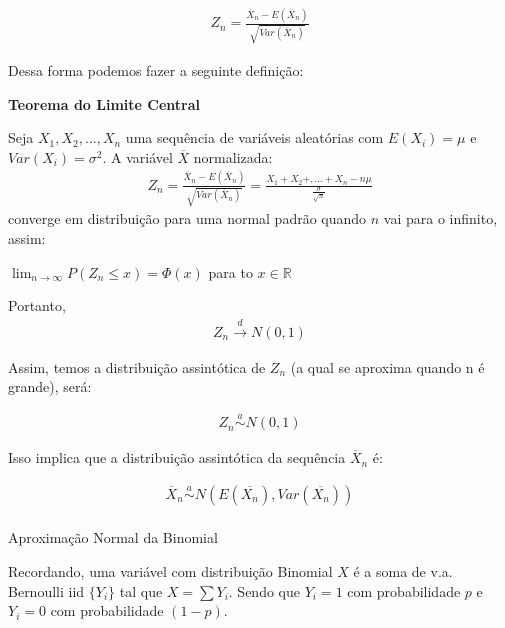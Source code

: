 \documentclass[
  letterpaper,
  DIV=11,
  numbers=noendperiod]{scrartcl}
\makeatletter
\let\oldparagraph\paragraph
\renewcommand{\paragraph}{
    \@ifstar
      \xxxParagraphStar
      \xxxParagraphNoStar
  }
\newcommand{\xxxParagraphStar}[1]{\oldparagraph*{#1}\mbox{}}
\newcommand{\xxxParagraphNoStar}[1]{\oldparagraph{#1}\mbox{}}
\makeatother
\begin{document}
\hfill\break

\[\begin{array}{ccc}
Z_n=\frac{\overline{X}_n- E(\overline{X}_n)}{\sqrt{Var(\overline{X}_n)}} 
\end{array}\]

Dessa forma podemos fazer a seguinte definição:

\begin{definicao}

\textbf{Teorema do Limite Central}

Seja \(X_1, X_2,...,X_n\) uma sequência de variáveis aleatórias com
\(E(X_i)=\mu\) e \(Var(X_i)=\sigma^2\). A variável \(\overline{X}\)
normalizada: \[\begin{array}{ccc}
Z_n=\frac{\overline{X}_n- E(\overline{X}_n)}{\sqrt{Var(\overline{X}_n)}} =\frac{X_1+X_2+,...+X_n-n\mu}{\frac{\sigma}{\sqrt{n}}}
\end{array}\] converge em distribuição para uma normal padrão quando
\(n\) vai para o infinito, assim:

\(\lim_{n \rightarrow\infty}P(Z_n \leq x)=\Phi(x)\) para to
\(x \in \mathbb{R}\)

Portanto, \[\begin{array}{ccc}
Z_n \overset{d}{\rightarrow} N(0,1)
\end{array}\]

\end{definicao}

Assim, temos a distribuição assintótica de \(Z_n\) (a qual se aproxima
quando n é grande), será:

\[\begin{array}{ccc}
Z_n \overset{a}{\sim } N(0,1)
\end{array}\]

Isso implica que a distribuição assintótica da sequência
\(\overline{X}_n\) é:

\[\begin{array}{ccc}
\overline{X}_n\overset{a}{\sim }N(E(\overline{X_n}),Var(\overline{X_n}))
\end{array}\]

\paragraph{Aproximação Normal da
Binomial}\label{aproximauxe7uxe3o-normal-da-binomial}

Recordando, uma variável com distribuição Binomial \(X\) é a soma de
v.a. Bernoulli iid \(\{Y_i\}\) tal que \(X= \sum Y_i\). Sendo que
\(Y_i=1\) com probabilidade \(p\) e \(Y_i=0\) com probabilidade
\((1-p)\).
\end{document}
